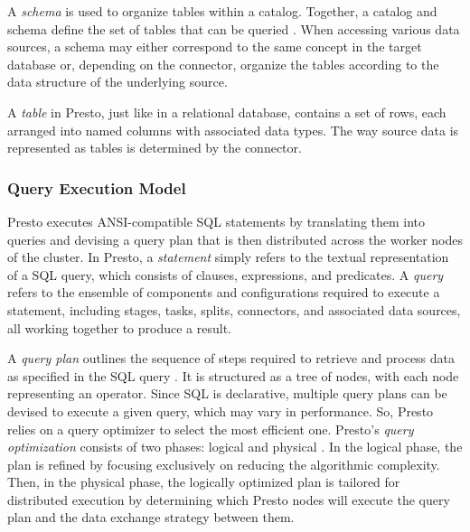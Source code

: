 \documentclass[conference]{IEEEtran}
\begin{document}
A \textit{schema} is used to organize tables within a catalog. Together, a catalog and schema define the set of tables that can be queried \cite{b2}. When accessing various data sources, a schema may either correspond to the same concept in the target database or, depending on the connector, organize the tables according to the data structure of the underlying source.

A \textit{table} in Presto, just like in a relational database, contains a set of rows, each arranged into named columns with associated data types. The way source data is represented as tables is determined by the connector.


\subsubsection{Query Execution Model}

Presto executes ANSI-compatible SQL statements by translating them into queries and devising a query plan that is then distributed across the worker nodes of the cluster.
\newline \indent In Presto, a \textit{statement} simply refers to the textual representation of a SQL query, which consists of clauses, expressions, and predicates.
A \textit{query} refers to the ensemble of components and configurations required to execute a statement, including stages, tasks, splits, connectors, and associated data sources, all working together to produce a result.

A \textit{query plan} outlines the sequence of steps required to retrieve and process data as specified in the SQL query \cite{b2}. It is structured as a tree of nodes, with each node representing an operator. Since SQL is declarative, multiple query plans can be devised to execute a given query, which may vary in performance. So, Presto relies on a query optimizer to select the most efficient one.
Presto’s \textit{query optimization} consists of two phases: logical and physical \cite{b2}. In the logical phase, the plan is refined by focusing exclusively on reducing the algorithmic complexity. Then, in the physical phase, the logically optimized plan is tailored for distributed execution by determining which Presto nodes will execute the query plan and the data exchange strategy between them.
\end{document}
